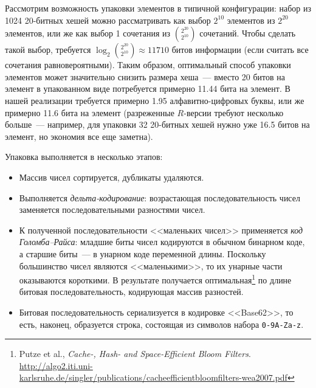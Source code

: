 \documentclass[russian,a4paper,12pt,titlepage]{article}
\begin{document}
Рассмотрим возможность упаковки элементов в типичной конфигурации: набор из 1024 20-битных хешей можно рассматривать
как выбор $2^{10}$ элементов из $2^{20}$ элементов, или же как выбор 1 сочетания из ${2^{20}\choose2^{10}}$ сочетаний.
Чтобы сделать такой выбор, требуется $\log_2{{2^{20}}\choose{2^{10}}}\approx11710$ битов информации (если считать
все сочетания равновероятными).  Таким образом, оптимальный способ упаковки элементов может значительно снизить размера хеша~---
вместо 20 битов на элемент в упакованном виде потребуется примерно 11.44 бита на элемент.
В нашей реализации требуется примерно 1.95 алфавитно-цифровых буквы, или же примерно 11.6 бита на элемент
(разреженные $R$-версии требуют несколько больше~--- например, для упаковки 32 20-битных хешей нужно уже 16.5 битов на элемент,
но экономия все еще заметна).

Упаковка выполняется в несколько этапов:
\begin{itemize}
\item Массив чисел сортируется, дубликаты удаляются.
\item Выполняется \emph{дельта-кодирование}: возрастающая последовательность чисел заменяется
последовательными разностями чисел.
\item К полученной последовательности <<маленьких чисел>> применяется \emph{код Голомба--Райса}:
младшие биты чисел кодируются в обычном бинарном коде, а старшие биты~--- в унарном
коде переменной длины.  Поскольку большинство чисел являются <<маленькими>>, то их унарные
части оказываются короткими.  В результате получается оптимальная\footnote{Putze et al.,
\textsl{Cache-, Hash- and Space-Efficient Bloom Filters}.
\url{http://algo2.iti.uni-karlsruhe.de/singler/publications/cacheefficientbloomfilters-wea2007.pdf}}
по длине битовая последовательность, кодирующая массив разностей.
\item Битовая последовательность сериализуется в кодировке <<Base62>>,
то есть, наконец, образуется строка, состоящая из символов набора \verb|0-9A-Za-z|.
\end{itemize}
\end{document}

